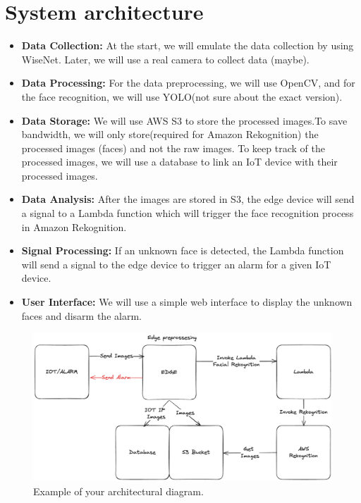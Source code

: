 \documentclass[conference]{IEEEtran}
\begin{document}
\section{System architecture}
\begin{itemize}
    \item \textbf{Data Collection:} At the start, we will emulate the data collection by using WiseNet. Later, we will use a real camera to collect data (maybe).
    \item \textbf{Data Processing:} For the data preprocessing, we will use OpenCV, and for the face recognition, we will use YOLO(not sure about the exact version).
    \item \textbf{Data Storage:} We will use AWS S3 to store the processed images.To save bandwidth, we will only store(required for Amazon Rekognition) the processed images (faces) 
                                    and not the raw images. To keep track of the processed images, we will use a database to link an IoT device with their processed images.
    \item \textbf{Data Analysis:} After the images are stored in S3, the edge device will send a signal to a Lambda function which will trigger the face recognition 
                                    process in Amazon Rekognition.
    \item \textbf{Signal Processing:} If an unknown face is detected, the Lambda function will send a signal to the edge device to trigger an alarm for a given IoT device.
    \item \textbf{User Interface:} We will use a simple web interface to display the unknown faces and disarm the alarm.
\end{itemize}

\begin{figure}[h!]
    \centering
    \includegraphics[width=1\linewidth]{images/architecture.excalidraw.png}
    \caption{Example of your architectural diagram.}
    \label{fig:enter-label}
\end{figure}
\end{document}
